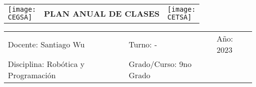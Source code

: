 \documentclass[landscape, a4paper, 10pt]{article}
\newcommand{\profesor}{Santiago Wu}
\newcommand{\discipline}{Robótica y Programación}
\newcommand{\currentyear}{2023}
\newcommand{\CEGSA}{cegsa-logo.png}
\newcommand{\CETSA}{cetsa-logo.png}
\begin{document}
	\pagebreak[4]
	\begin{tabularx}{\textwidth}{ >{\raggedright\arraybackslash}X >{\centering\arraybackslash}X >{\raggedleft\arraybackslash}X }
		\texttt{[image: \\CEGSA]} &
		\textbf{PLAN ANUAL DE CLASES} &
		\texttt{[image: \\CETSA]}
	\end{tabularx}
	\begin{tabularx}{\textwidth}{ >{\raggedright\arraybackslash}X >{\raggedright\arraybackslash}X >{\raggedright\arraybackslash}X }
		Docente: \profesor &
		Turno: - &
		Año: \currentyear \\
		Disciplina: \discipline &
		Grado/Curso: 9no Grado &
		 \\
	\end{tabularx}
	\centering
\end{document}
